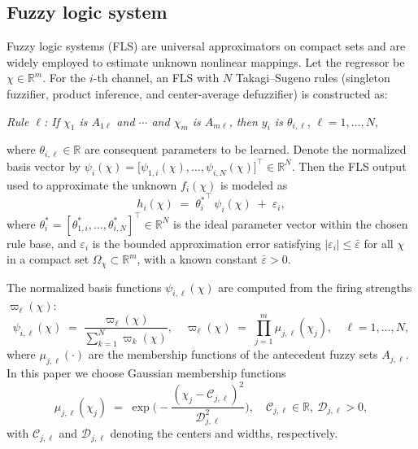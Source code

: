\documentclass[pdflatex,sn-mathphys-num]{sn-jnl}%
\theoremstyle{thmstyleone}%
\newtheorem{assumption}{Assumption}
\theoremstyle{thmstyletwo}%
\theoremstyle{thmstylethree}%
\begin{document}


 


\subsection{Fuzzy logic system }
\par Fuzzy logic systems (FLS) are universal approximators on compact sets and are widely employed to estimate unknown nonlinear mappings. Let the regressor be $\chi\in\mathbb{R}^m$. For the $i$-th channel, an FLS with $N$ Takagi--Sugeno rules (singleton fuzzifier, product inference, and center-average defuzzifier) is constructed as:
\begin{center}
\emph{Rule $\ell$: If $\chi_1$ is $A_{1\ell}$ and $\cdots$ and $\chi_m$ is $A_{m\ell}$, then $y_i$ is $\theta_{i,\ell}$}, \quad $\ell=1,\dots,N$,
\end{center}
where $\theta_{i,\ell}\in\mathbb{R}$ are consequent parameters to be learned. Denote the normalized basis vector by
\(
\psi_i(\chi)=\big[\psi_{1,i}(\chi),\dots,\psi_{i,N}(\chi)\big]^\top\in\mathbb{R}^N.
\)
Then the FLS output used to approximate the unknown $f_i(\chi)$ is modeled as
\begin{equation}
    h_i(\chi) \;=\; {\theta_i^*}^{\!\top}\,\psi_i(\chi)\;+\;\varepsilon_i,
    \label{eq:4}
\end{equation}
where $\theta_i^*=[\theta_{1,i}^*,\dots,\theta_{i,N}^*]^\top\in\mathbb{R}^N$ is the ideal parameter vector within the chosen rule base, and $\varepsilon_i$ is the bounded approximation error satisfying $|\varepsilon_i|\le\bar\varepsilon$ for all $\chi$ in a compact set $\Omega_\chi\subset\mathbb{R}^m$, with a known constant $\bar\varepsilon>0$.

\par The normalized basis functions $\psi_{i,\ell}(\chi)$ are computed from the firing strengths $\varpi_\ell(\chi)$:
\begin{equation}
    \psi_{i,\ell}(\chi)\;=\;\frac{\varpi_\ell(\chi)}{\sum_{k=1}^N \varpi_k(\chi)},
    \quad
    \varpi_\ell(\chi)\;=\;\prod_{j=1}^m \mu_{j,\ell}(\chi_j),
    \quad \ell=1,\dots,N,
    \label{eq:5}
\end{equation}
where $\mu_{j,\ell}(\cdot)$ are the membership functions of the antecedent fuzzy sets $A_{j,\ell}$. In this paper we choose Gaussian membership functions
\[
\mu_{j,\ell}(\chi_j)\;=\;\exp\!\Big(-\frac{(\chi_j-\mathcal{C}_{j,\ell})^2}{\mathcal{D}_{j,\ell}^2}\Big),\quad
\mathcal{C}_{j,\ell}\in\mathbb{R},\ \mathcal{D}_{j,\ell}>0,
\]
with $\mathcal{C}_{j,\ell}$ and $\mathcal{D}_{j,\ell}$ denoting the centers and widths, respectively.
\end{document}
